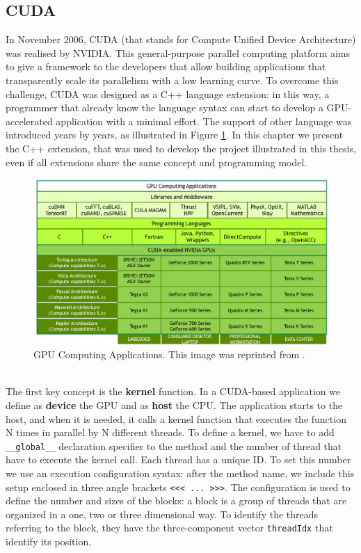 \subsection{CUDA}
In November 2006, CUDA (that stands for Compute Unified Device Architecture) was realised by NVIDIA. This general-purpose parallel computing platform aims to give a framework to the developers that allow building applications that transparently scale its parallelism with a low learning curve. To overcome this challenge, CUDA was designed as a C++ language extension: in this way, a programmer that already know the language syntax can start to develop a GPU-accelerated application with a minimal effort. The support of other language was introduced years by years, as illustrated in Figure \ref{fig:gpu-computing-applications}. In this chapter we present the C++ extension, that was used to develop the project illustrated in this thesis, even if all extensions share the same concept and programming model.
\begin{figure}
	\centering
	\includegraphics[width=0.8\linewidth]{0-resources/gpu-computing-applications}
	\caption{GPU Computing Applications. This image was reprinted from \cite{cuda_manual}.}
	\label{fig:gpu-computing-applications}
\end{figure}\\
The first key concept is the \textbf{kernel} function. In a CUDA-based application we define as \textbf{device} the GPU and as \textbf{host} the CPU. The application starts to the host, and when it is needed, it calls a kernel function that executes the function N times in parallel by N different threads. To define a kernel, we have to add \verb|__global__| declaration specifier to the method and the number of thread that have to execute the kernel call. Each thread has a unique ID. To set this number we use an execution configuration syntax: after the method name, we include this setup enclosed in three angle brackets \verb|<<< ... >>>|. The configuration is used to define the number and sizes of the blocks: a block is a group of threads that are organized in a one, two or three dimensional way. To identify the threads referring to the block, they have the three-component vector \verb|threadIdx| that identify its position.
